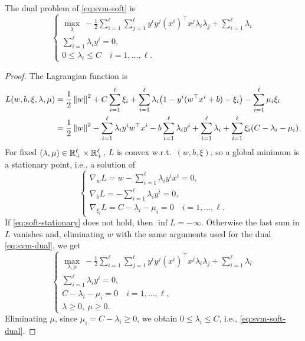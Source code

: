 \begin{example}[Exercise 5.2]
    The dual problem of \cref{eq:svm-soft} is
    \begin{equation}
        \begin{cases}
            \displaystyle \max_{\lambda} \ -\frac{1}{2} \sum_{i=1}^{\ell} \sum_{j=1}^{\ell} y^i y^j (x^i)^\top x^j \lambda_i \lambda_j + \sum_{i=1}^{\ell} \lambda_i \\
            \displaystyle \sum_{i=1}^{\ell} \lambda_i y^i = 0, \\
            0 \le \lambda_i \le C \quad i = 1, \dots, \ell.
        \end{cases}
        \label{eq:svm-soft-dual}
    \end{equation}
    \begin{proof}
        The Lagrangian function is
        \begin{align*}
            L(w, b, \xi, \lambda, \mu) &= \frac{1}{2} \left\lVert w \right\rVert^2 + C \sum_{i=1}^{\ell} \xi_i + \sum_{i=1}^{\ell} \lambda_i \bigl(1 - y^i (w^\top x^i + b) - \xi_i\bigr) - \sum_{i=1}^{\ell} \mu_i \xi_i \\
            &= \frac{1}{2} \left\lVert w \right\rVert^2 - \sum_{i=1}^{\ell} \lambda_i y^i w^\top x^i - b \sum_{i=1}^{\ell} \lambda_i y^i + \sum_{i=1}^{\ell} \lambda_i + \sum_{i=1}^{\ell} \xi_i (C - \lambda_i - \mu_i).
        \end{align*}
        For fixed $(\lambda, \mu) \in \mathbb{R}^\ell_+ \times \mathbb{R}^\ell_+$, $L$ is convex w.r.t.\ $(w, b, \xi)$, so a global minimum is a stationary point, i.e., a solution of
        \begin{equation}
            \begin{cases}
                \displaystyle \nabla_w L = w - \sum_{i=1}^{\ell} \lambda_i y^i x^i = 0, \\
                \displaystyle \nabla_b L = - \sum_{i=1}^{\ell} \lambda_i y^i = 0, \\
                \nabla_{\xi_i} L = C - \lambda_i - \mu_i = 0 \quad i = 1, \dots, \ell.
            \end{cases}
            \label{eq:soft-stationary}
        \end{equation}
        If \cref{eq:soft-stationary} does not hold, then $\inf L = -\infty$. Otherwise the last sum in $L$ vanishes and, eliminating $w$ with the same arguments used for the dual \cref{eq:svm-dual}, we get
        \[
            \begin{cases}
                \displaystyle \max_{\lambda, \mu} \ -\frac{1}{2} \sum_{i=1}^{\ell} \sum_{j=1}^{\ell} y^i y^j (x^i)^\top x^j \lambda_i \lambda_j + \sum_{i=1}^{\ell} \lambda_i \\
                \displaystyle \sum_{i=1}^{\ell} \lambda_i y^i = 0, \\
                C - \lambda_i - \mu_i = 0 \quad i = 1, \dots, \ell, \\
                \lambda \ge 0, \ \mu \ge 0.
            \end{cases}
        \]
        Eliminating $\mu$, since $\mu_i = C - \lambda_i \ge 0$, we obtain $0 \le \lambda_i \le C$, i.e., \cref{eq:svm-soft-dual}.
    \end{proof}
\end{example}

